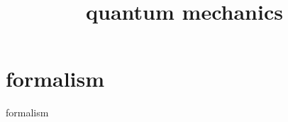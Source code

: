 \documentclass{article}
\begin{document}
\title{quantum mechanics}
\section{formalism}
formalism
\end{document}
